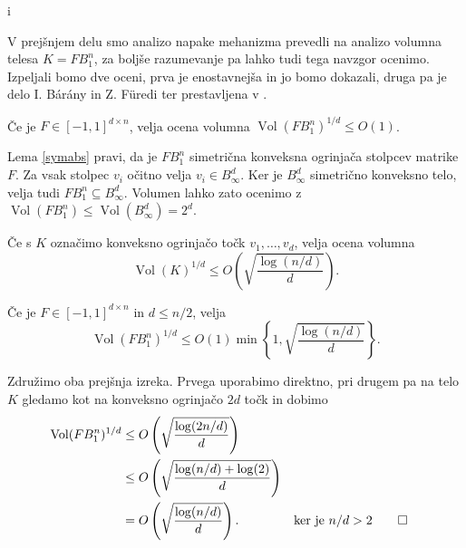 i\documentclass[mat1]{fmfdelo}
\DeclareMathOperator{\Vol}{Vol}
\begin{document}
V prejšnjem delu smo analizo napake mehanizma prevedli na analizo volumna telesa $K=FB_1^n$, za boljše razumevanje pa lahko tudi tega navzgor ocenimo. Izpeljali bomo dve oceni, prva je enostavnejša in jo bomo dokazali, druga pa je delo I. Bárány in Z. Füredi ter prestavljena v \cite{sphere}.

\begin{izrek}
    Če je $F \in [-1,1]^{d \times n}$, velja ocena volumna $\Vol(FB_1^n)^{1/d} \leq O(1)$.
\end{izrek}
\begin{dokaz} \label{uppervolconst}
    Lema \ref{symabs} pravi, da je $FB_1^n$ simetrična konveksna ogrinjača stolpcev matrike $F$. Za vsak stolpec $v_i$ očitno velja $v_i \in B_{\infty}^d$. Ker je $B_{\infty}^d$ simetrično konveksno telo, velja tudi $FB_1^n \subseteq B_{\infty}^d$. Volumen lahko zato ocenimo z $\Vol(FB_1^n) \leq \Vol(B_{\infty}^d) = 2^d$.
\end{dokaz}

\begin{izrek}
    Če s $K$ označimo konveksno ogrinjačo točk $v_1,\dots,v_d$, velja ocena volumna
    \begin{equation*}
        \Vol(K)^{1/d} \leq O\left(\sqrt{\frac{\log(n/d)}{d}}\right).
    \end{equation*}
\end{izrek}

\begin{posledica} \label{uppervolume}
    Če je $F \in [-1,1]^{d \times n}$ in $d \leq n/2$, velja
    \begin{equation*}
        \Vol(FB_1^n)^{1/d} \leq O(1) \min \left\{1, \sqrt{\frac{\log(n/d)}{d}}\right\}.
    \end{equation*}
\end{posledica}
\begin{dokaz}
    Združimo oba prejšnja izreka. Prvega uporabimo direktno, pri drugem pa na telo $K$ gledamo kot na konveksno ogrinjačo $2d$ točk in dobimo
    \begin{align*}
        \Vol(FB_1^n)^{1/d} &\leq O\left(\sqrt{\frac{\log(2n/d)}{d}}\right) \\
        &\leq O\left(\sqrt{\frac{\log(n/d) + \log(2)}{d}}\right) \\
        &= O\left(\sqrt{\frac{\log(n/d)}{d}}\right). && \text{ker je } n/d > 2 \qedhere
    \end{align*}
\end{dokaz}
\end{document}
